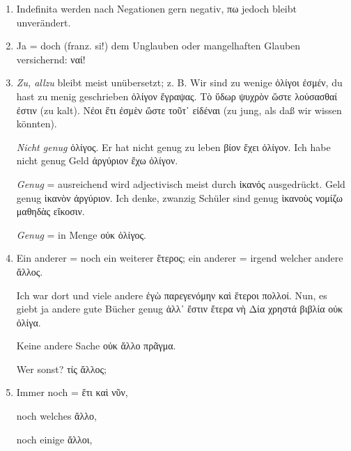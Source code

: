 \begin{enumerate}[leftmargin=0pt,rightmargin=0pt,listparindent =1cm,labelindent=1cm,labelsep=1ex,labelwidth={*},itemindent={*},align=left]
\item Indefinita werden nach Negationen gern negativ, \textgreek[variant=ancient]{πω}
jedoch bleibt unverändert.
\item Ja = doch (franz. \textfrench{si!}) dem Unglauben oder mangelhaften
Glauben versichernd: \textgreek[variant=ancient]{ναί! }
\item \emph{Zu, allzu} bleibt meist unübersetzt; z. B. Wir sind zu wenige
\textgreek[variant=ancient]{ὀλίγοι ἐσμέν,} du hast zu menig geschrieben
\textgreek[variant=ancient]{ὀλίγον ἔγραψας.} \textgreek[variant=ancient]{Τὸ
ὕδωρ ψυχρὸν ὥστε λούσασθαί ἐστιν} (zu kalt). \textgreek[variant=ancient]{Νέοι
ἔτι ἐσμὲν ὥστε τοῦτ᾽ εἰδέναι} (zu jung, als daß wir wissen könnten).


\emph{Nicht genug} \textgreek[variant=ancient]{ὀλίγος.} Er hat nicht
genug zu leben \textgreek[variant=ancient]{βίον ἔχει ὀλίγον.} Ich
habe nicht genug Geld \textgreek[variant=ancient]{ἀργύριον ἔχω ὀλίγον.}


\emph{Genug} = ausreichend wird adjectivisch meist durch \textgreek[variant=ancient]{ἱκανός}
ausgedrückt. Geld genug \textgreek[variant=ancient]{ἱκανὸν ἀργύριον.}
Ich denke, zwanzig Schüler sind genug \textgreek[variant=ancient]{ἱκανοὺς
νομίζω μαθηδὰς εἴκοσιν.}


\emph{Genug} = in Menge \textgreek[variant=ancient]{οὐκ ὀλίγος.}

\item Ein anderer = noch ein weiterer \textgreek[variant=ancient]{ἕτερος;
}ein anderer = irgend welcher andere \textgreek[variant=ancient]{ἄλλος.}


Ich war dort und viele andere \textgreek[variant=ancient]{ἐγὼ παρεγενόμην
καὶ ἕτεροι πολλοί.} Nun, es giebt ja andere gute Bücher genug \textgreek[variant=ancient]{ἀλλ᾽
ἔστιν ἔτερα νὴ Δία χρηστά βιβλία οὐκ ὀλίγα.}


\begin{continuousitemline}Keine andere Sache \textgreek[variant=ancient]{οὐκ
ἄλλο πρᾶγμα.}


Wer sonst? \textgreek[variant=ancient]{τίς ἄλλος;}\par\end{continuousitemline}

\item Immer noch = \textgreek[variant=ancient]{ἔτι καὶ νῦν,}


\begin{continuousitemline}noch welches \textgreek[variant=ancient]{ἄλλο,}


noch einige \textgreek[variant=ancient]{ἄλλοι,}



\end{continuousitemline}
\end{enumerate}
